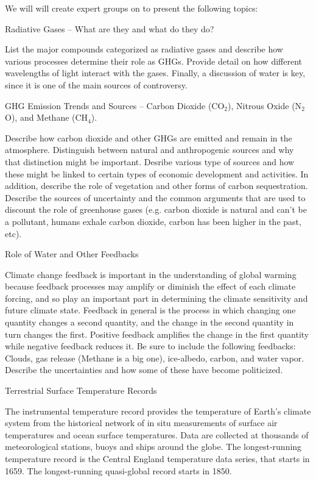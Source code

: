 \documentclass{article}\usepackage[]{graphicx}\usepackage[]{color}
\newenvironment{enumerate*}%
  {\begin{enumerate}%
    \setlength{\itemsep}{0pt}%
    \setlength{\parskip}{0pt}}%
  {\end{enumerate}}
\begin{document}
We will will create expert groups on to present the following topics:

\begin{enumerate*}
  \item Radiative Gases -- What are they and what do they do?
  
List the major compounds categorized as radiative gases and describe how various processes determine their role as GHGs. Provide detail on how different wavelengths of light interact with the gases. Finally, a discussion of water is key, since it is one of the main sources of controversy. 
  
  \item GHG Emission Trends and Sources -- Carbon Dioxide (CO$_2$), Nitrous Oxide (N$_2$O), and Methane (CH$_4$).

Describe how carbon dioxide and other GHGs are emitted and remain in the atmosphere. Distinguish between natural and anthropogenic sources and why that distinction might be important. Desribe various type of sources and how these might be linked to certain types of economic development and activities. In addition, describe the role of vegetation and other forms of carbon sequestration. Describe the sources of uncertainty and the common arguments that are used to discount the role of greenhouse gases (e.g. carbon dioxide is natural and can't be a pollutant, humans exhale carbon dioxide, carbon has been higher in the past, etc). 

  \item Role of Water and Other Feedbacks
  
Climate change feedback is important in the understanding of global warming because feedback processes may amplify or diminish the effect of each climate forcing, and so play an important part in determining the climate sensitivity and future climate state. Feedback in general is the process in which changing one quantity changes a second quantity, and the change in the second quantity in turn changes the first. Positive feedback amplifies the change in the first quantity while negative feedback reduces it. Be sure to include the following feedbacks: Clouds, gas release (Methane is a big one), ice-albedo, carbon, and water vapor. Describe the uncertainties and how some of these have become politicized.

  \item Terrestrial Surface Temperature Records
  
The instrumental temperature record provides the temperature of Earth's climate system from the historical network of in situ measurements of surface air temperatures and ocean surface temperatures. Data are collected at thousands of meteorological stations, buoys and ships around the globe. The longest-running temperature record is the Central England temperature data series, that starts in 1659. The longest-running quasi-global record starts in 1850. 
  

\end{enumerate*}
\end{document}
